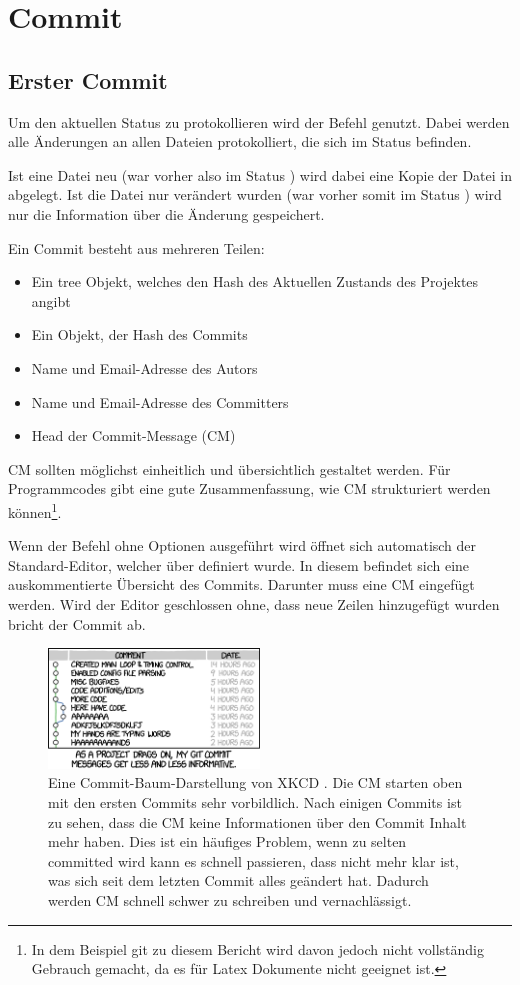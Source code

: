 \section{Commit}
\subsection{Erster Commit}
Um den aktuellen Status zu protokollieren wird der Befehl  genutzt. Dabei werden alle Änderungen an allen Dateien protokolliert, die sich im Status  befinden.

Ist eine Datei neu (war vorher also im Status ) wird dabei eine Kopie der Datei in  abgelegt. Ist die Datei nur verändert wurden (war vorher somit im Status ) wird nur die Information über die Änderung gespeichert.

Ein Commit besteht aus mehreren Teilen: 
\begin{itemize}
	\item Ein tree Objekt, welches den Hash des Aktuellen Zustands des Projektes angibt
	\item Ein  Objekt, der Hash des  Commits
	\item Name und Email-Adresse des Autors
	\item Name und Email-Adresse des Committers
	\item Head der Commit-Message (CM)
\end{itemize}
CM sollten möglichst einheitlich und übersichtlich gestaltet werden. Für Programmcodes gibt \cite{conv-Commit} eine gute Zusammenfassung, wie CM strukturiert werden können\footnote{In dem Beispiel git zu diesem Bericht wird davon jedoch nicht vollständig Gebrauch gemacht, da es für Latex Dokumente nicht geeignet ist.}.

Wenn der Befehl  ohne Optionen ausgeführt wird öffnet sich automatisch der Standard-Editor, welcher über  definiert wurde. In diesem befindet sich eine auskommentierte Übersicht des Commits. Darunter muss eine CM eingefügt werden. Wird der Editor geschlossen ohne, dass neue Zeilen hinzugefügt wurden bricht der Commit ab.
\begin{figure}[!h]
        \centering
        \includegraphics[width=0.5\textwidth]{Bilder/git_commit.png}
        \caption{Eine Commit-Baum-Darstellung von XKCD \cite{Munroe}. Die CM starten oben mit den ersten Commits sehr vorbildlich. Nach einigen Commits ist zu sehen, dass die CM keine Informationen über den Commit Inhalt mehr haben. Dies ist ein häufiges Problem, wenn zu selten committed wird kann es schnell passieren, dass nicht mehr klar ist, was sich seit dem letzten Commit alles geändert hat. Dadurch werden CM schnell schwer zu schreiben und vernachlässigt.}
        \label{fig:Commit-XKCD}
\end{figure}

